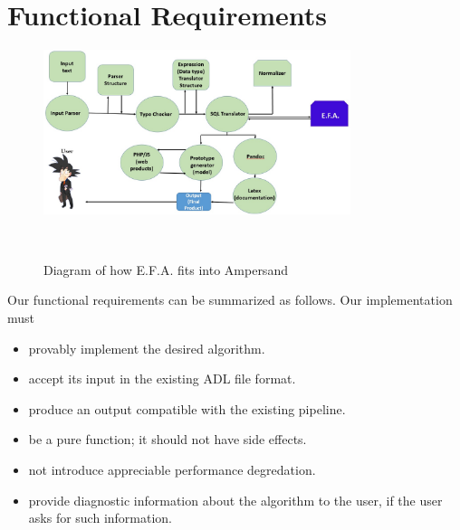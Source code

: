 \documentclass[12pt]{report}
\begin{document}
\section{Functional Requirements}\label{sec:Functional}
\begin{figure}[!htb]
	\centering
	\includegraphics[width=0.8\textwidth]{../figures/functional}
	\caption{Diagram of how E.F.A. fits into Ampersand}~\label{fig:figure2}
\end{figure}
Our functional requirements can be summarized as follows. Our implementation must
\begin{itemize}
\item provably implement the desired algorithm.
\item accept its input in the existing ADL file format.
\item produce an output compatible with the existing pipeline. 
\item be a pure function; it should not have side effects.  
\item not introduce appreciable performance degredation. 
\item provide diagnostic information about the algorithm to
the user, if the user asks for such information.
\end{itemize}
\end{document}
